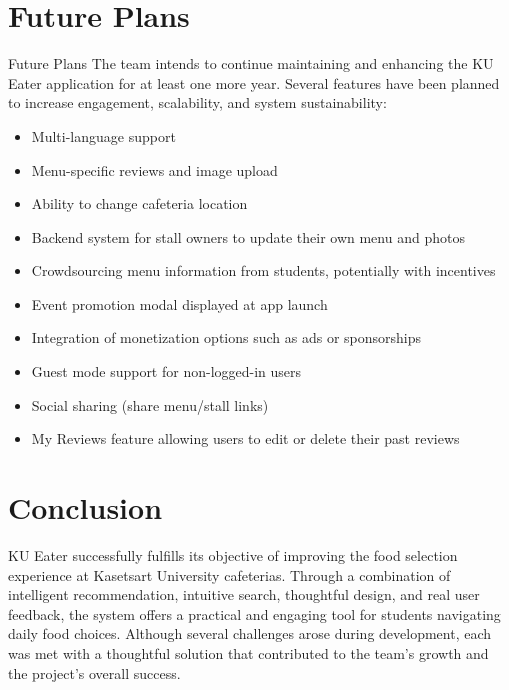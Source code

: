 \section{Future Plans}
\label{section:future-plans}
Future Plans
The team intends to continue maintaining and enhancing the KU Eater application for at least one more year. Several features have been planned to increase engagement, scalability, and system sustainability:
\begin{itemize}[leftmargin=40pt]
    \item Multi-language support
    \item Menu-specific reviews and image upload
    \item Ability to change cafeteria location
    \item Backend system for stall owners to update their own menu and photos
    \item Crowdsourcing menu information from students, potentially with incentives
    \item Event promotion modal displayed at app launch
    \item Integration of monetization options such as ads or sponsorships
    \item Guest mode support for non-logged-in users
    \item Social sharing (share menu/stall links)
    \item My Reviews feature allowing users to edit or delete their past reviews
\end{itemize}

\section{Conclusion}
\label{section:conclusion-project}
KU Eater successfully fulfills its objective of improving the food selection experience at Kasetsart University cafeterias. Through a combination of intelligent recommendation, intuitive search, thoughtful design, and real user feedback, the system offers a practical and engaging tool for students navigating daily food choices. Although several challenges arose during development, each was met with a thoughtful solution that contributed to the team's growth and the project's overall success.